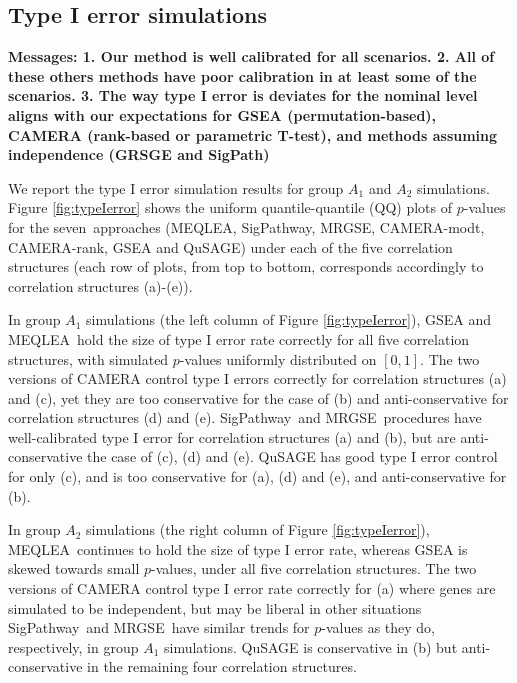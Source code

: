 \documentclass[a4,center,fleqn]{NAR}
\newcommand{\OurMethod}{MEQLEA}
\newcommand{\aaCase}{a}
\newcommand{\aCase}{c}
\newcommand{\cCase}{b}
\newcommand{\eCase}{d}
\newcommand{\fCase}{e}
\newcommand{\CMR}{CAMERA-rank}
\newcommand{\CMT}{CAMERA-modt}
\newcommand{\gent}{SigPathway}
\newcommand{\genr}{MRGSE}
\begin{document}
	
	
	\subsection{Type I error simulations}\label{subsection:typeIerror}
	
\textbf{Messages: 1. Our method is well calibrated for all scenarios. 2. All of these others methods have poor calibration in at least some of the scenarios. 3. The way type I error is deviates for the nominal level aligns with our expectations for GSEA (permutation-based), CAMERA (rank-based or parametric T-test), and methods assuming independence (GRSGE and SigPath)}
	
	We report the type I error simulation results for group $A_1$ and $A_2$ simulations. Figure
	\ref{fig:typeIerror} shows the uniform quantile-quantile (QQ) plots of $p$-values for the
	seven~approaches (\OurMethod, \gent, \genr, \CMT, \CMR, GSEA and QuSAGE) under each of the five
	correlation structures (each row of plots, from top to
	bottom, corresponds accordingly to correlation structures (\aaCase)-(\fCase)). 
	
	In group $A_1$ simulations (the left column of Figure \ref{fig:typeIerror}),  GSEA and
	\OurMethod~hold the size of type I error rate correctly for all five correlation structures, with
	simulated $p$-values uniformly distributed on $[0, 1]$. The two versions of CAMERA control type I
	errors correctly for correlation structures (\aaCase) and (\aCase), yet they are too conservative
	for the case of (\cCase) and anti-conservative for correlation structures (\eCase) and (\fCase).
	\gent~and \genr~procedures have well-calibrated type I error for correlation structures (\aaCase)
	and (\cCase), but are anti-conservative the case of (\aCase), (\eCase) and (\fCase). QuSAGE has good
	type I error control for only (\aCase), and is too conservative for (\aaCase), (\eCase) and
	(\fCase), and anti-conservative for (\cCase).
	
	In group $A_2$ simulations (the right column of Figure \ref{fig:typeIerror}),  \OurMethod~continues
	to hold the size of type I error rate, whereas GSEA is skewed towards small $p$-values, under all
	five correlation structures. The two versions of CAMERA control type I error rate correctly for
	(\aaCase) where genes are simulated to be independent, but may be liberal in other situations
	\gent~and \genr~have similar trends for $p$-values as they do, respectively, in group $A_1$
	simulations. QuSAGE is conservative in (\cCase) but anti-conservative in the remaining four
	correlation structures.
	
\end{document}
